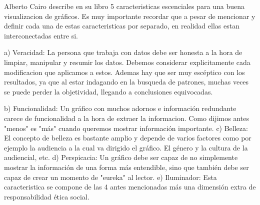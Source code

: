 Alberto Cairo describe en su libro 5 caracteristicas escenciales para una buena visualizacion de gráficos.
Es muy importante recordar que a pesar de mencionar y definir cada una de estas caracteristicas por separado, en realidad ellas estan interconectadas entre si.

a) Veracidad: La persona que trabaja con datos debe ser honesta a la hora de limpiar, manipular y resumir los datos. Debemos considerar explicitamente cada modificacion que aplicamos a estos.
              Ademas hay que ser muy escéptico con los resultados, ya que al estar indagando en la busqueda de patrones, muchas veces se puede perder la objetividad, llegando a conclusiones equivocadas.

b) Funcionalidad: Un gráfico con muchos adornos e información redundante carece de funcionalidad a la hora de extraer la informacion. Como dijimos antes "menos" es "más" cuando queremos mostrar información importante.
c) Belleza: El concepto de belleza es bastante amplio y depende de varios factores como por ejemplo la audiencia a la cual va dirigido el gráfico. El género y la cultura de la audiencial, etc.
d) Perspicacia: Un gráfico debe ser capaz de no simplemente mostrar la información de una forma más entendible, sino que también debe ser capaz de crear un momento de "eureka" al lector.
e) Iluminador: Esta caracteristica se compone de las 4 antes mencionadas más una dimensión extra de responsabilidad ética social.
